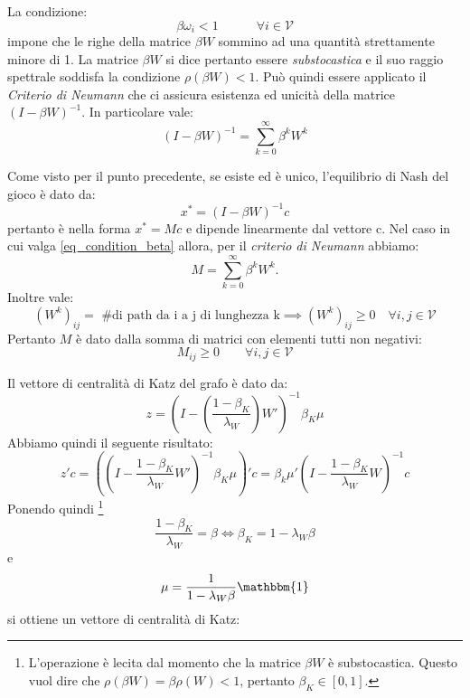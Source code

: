 \begin{alphaparts}
    La condizione:
    \begin{equation}\label{eq_condition_beta}
        \beta \omega_i < 1 \quad \quad \quad \forall i \in \mathcal{V}
    \end{equation}
    impone che le righe della matrice \(\beta W\) sommino ad una quantità strettamente minore di 1. La matrice \(\beta W\) si dice pertanto essere \textit{substocastica} e il suo raggio spettrale soddisfa la condizione \(\rho(\beta W) < 1\). Può quindi essere applicato il \textit{Criterio di Neumann} che ci assicura esistenza ed unicità della matrice \((I - \beta W)^{-1}\). In particolare vale:
    \begin{equation}
        (I-\beta W)^{-1} =  \sum \limits_{k=0}^{\infty} \beta^k W^k
    \end{equation}

    \questionpart
    Come visto per il punto precedente, se esiste ed è unico, l'equilibrio di Nash del gioco è dato da:
    \[
        x^* = (I -\beta W)^{-1} c
        \]
    pertanto è nella forma \(x^* = Mc\) e dipende linearmente dal vettore c. Nel caso in cui valga \eqref{eq_condition_beta} allora, per il \textit{criterio di Neumann} abbiamo:
    \begin{equation} \label{eq_neumann}
        M =  \sum \limits_{k=0}^{\infty} \beta^k W^k
    .\end{equation}
    Inoltre vale:
    \begin{equation*}
        (W^k)_{ij} = \text{ \# di path da i a j di lunghezza k} \implies (W^k)_{ij} \geq 0 \quad \forall i, j \in \mathcal{V}
    \end{equation*}
    Pertanto \(M\) è dato dalla somma di matrici con elementi tutti non negativi:
    \[M_{ij} \geq 0 \quad \quad \forall i, j \in \mathcal{V}\]

    \questionpart
    Il vettore di centralità di Katz del grafo è dato da:
    \begin{equation*}
        z = \left(I - \left(\frac{1-\beta_K}{\lambda_W}\right)W'\right)^{-1}\beta_K \mu
    \end{equation*}
    Abbiamo quindi il seguente risultato:
    \[
    z'c = \left(\left(I - \frac{1 - \beta_K}{\lambda_W}W'\right)^{-1} \beta_K \mu\right)' c = \beta_k \mu' \left(I - \frac{1 - \beta_K}{\lambda_W}W\right)^{-1}c    
    \]
    Ponendo quindi \footnote{L'operazione è lecita dal momento che  la matrice \(\beta W\) è substocastica. Questo vuol dire che \(\rho(\beta W) = \beta \rho(W) < 1\), pertanto \(\beta_K \in [0,1]\).}
    \[ \frac{1 - \beta_K}{\lambda_W} = \beta \iff \beta_K = 1 - \lambda_W \beta \]
    e
    \[\mu = \frac{1}{1 - \lambda_W \beta} \mathbbm{1}\]
    si ottiene un vettore di centralità di Katz:
    

\end{alphaparts}
